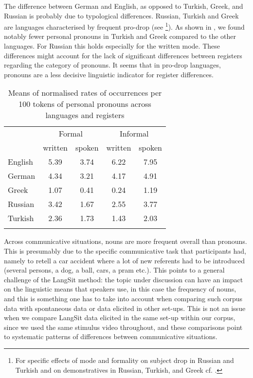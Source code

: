 \documentclass[output=paper,colorlinks,citecolor=brown]{langscibook}
\begin{document}
The difference between German and English, as opposed to Turkish, Greek, and Russian is probably due to typological differences. Russian, Turkish and Greek are languages characterised by frequent pro-drop (see \footnote{For specific effects of mode and formality on subject drop in Russian and Turkish and on demonstratives in Russian, Turkish, and Greek cf. .}). As shown in , we found notably fewer personal pronouns in Turkish and Greek compared to the other languages. For Russian this holds especially for the written mode. These differences might account for the lack of significant differences between registers regarding the category of pronouns. It seems that in pro-drop languages, pronouns are a less decisive linguistic indicator for register differences.

\begin{table}
\begin{tabular}{l *4{c}}
\lsptoprule
 & \multicolumn{2}{c}{Formal} & \multicolumn{2}{c}{Informal}\\\cmidrule(lr){2-3}\cmidrule(lr){4-5}
 & written  & spoken & written  & spoken \\\midrule
English & 5.39 & 3.74 & 6.22 & 7.95   \\
German & 4.34 & 3.21 & 4.17 & 4.91 \\
Greek & 1.07 & 0.41 & 0.24 & 1.19  \\
Russian & 3.42 & 1.67 & 2.55 & 3.77 \\
Turkish & 2.36 & 1.73 & 1.43 & 2.03 \\
\lspbottomrule
\end{tabular}
\caption{Means of normalised rates of occurrences per 100 tokens of personal pronouns across languages and registers}
\label{tab:ch1:tab3}
\end{table}

Across communicative situations, nouns are more frequent overall than pronouns. This is presumably due to the specific communicative task that participants had, namely to retell a car accident where a lot of new referents had to be introduced (several persons, a dog, a ball, cars, a pram etc.). This points to a general challenge of the LangSit method: the topic under discussion can have an impact on the linguistic means that speakers use, in this case the frequency of nouns, and this is something one has to take into account when comparing such corpus data with spontaneous data or data elicited in other set-ups. This is not an issue when we compare LangSit data elicited in the same set-up within our corpus, since we used the same stimulus video throughout, and these comparisons point to systematic patterns of differences between communicative situations.
\end{document}
